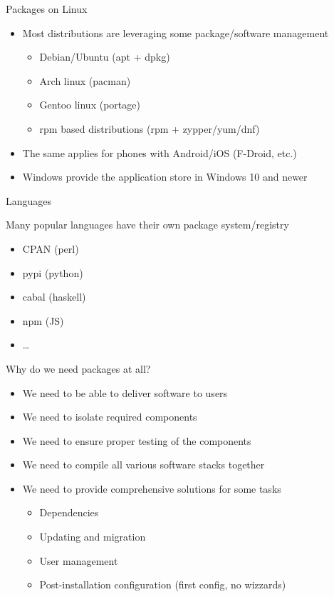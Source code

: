 \documentclass{beamer}
\begin{document}
\begin{frame}[t]{Packages on Linux}
	\begin{itemize}
	\item Most distributions are leveraging some package/software management
    \begin{itemize}
      \item Debian/Ubuntu (apt + dpkg)
      \item Arch linux (pacman)
      \item Gentoo linux (portage)
      \item rpm based distributions (rpm + zypper/yum/dnf)
    \end{itemize}
    \item The same applies for phones with Android/iOS (F-Droid, etc.)
    \item Windows provide the application store in Windows 10 and newer
  \end{itemize}
\end{frame}

\begin{frame}[t]{Languages}
  \begin{center}Many popular languages have their own package system/registry\end{center}
    \begin{itemize}
      \item CPAN (perl)
      \item pypi (python)
      \item cabal (haskell)
      \item npm (JS)
      \item \ldots
    \end{itemize}
\end{frame}

\begin{frame}[t]{Why do we need packages at all?}
	\begin{itemize}
	\item We need to be able to deliver software to users
    \item We need to isolate required components
	\item We need to ensure proper testing of the components
	\item We need to compile all various software stacks together
	\item We need to provide comprehensive solutions for some tasks
    \begin{itemize}
      \item Dependencies
      \item Updating and migration
      \item User management
      \item Post-installation configuration (first config, no wizzards)
    \end{itemize}
	\end{itemize}
\end{frame}
\end{document}
